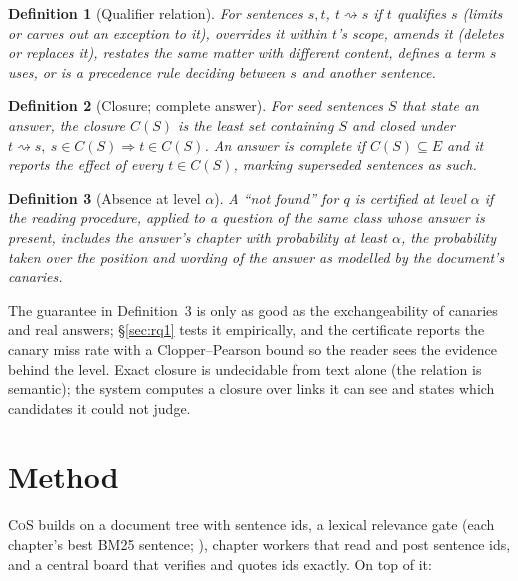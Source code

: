 \documentclass[11pt]{article}
\newtheorem{definition}{Definition}
\newcommand{\system}{\textsc{CoS}}          %
\begin{document}
\begin{definition}[Qualifier relation]
For sentences $s, t$, $t \rightsquigarrow s$ if $t$ \emph{qualifies} $s$ (limits or carves out an exception to it), \emph{overrides} it within $t$'s scope, \emph{amends} it (deletes or replaces it), \emph{restates} the same matter with different content, \emph{defines} a term $s$ uses, or is a \emph{precedence} rule deciding between $s$ and another sentence.
\end{definition}

\begin{definition}[Closure; complete answer]
For seed sentences $S$ that state an answer, the closure $C(S)$ is the least set containing $S$ and closed under $t \rightsquigarrow s,\ s \in C(S) \Rightarrow t \in C(S)$. An answer is \emph{complete} if $C(S) \subseteq E$ and it reports the effect of every $t \in C(S)$, marking superseded sentences as such.
\end{definition}

\begin{definition}[Absence at level $\alpha$]
A ``not found'' for $q$ is certified at level $\alpha$ if the reading procedure, applied to a question of the same class whose answer is present, includes the answer's chapter with probability at least $\alpha$, the probability taken over the position and wording of the answer as modelled by the document's canaries.
\end{definition}

\noindent The guarantee in Definition~3 is only as good as the exchangeability of canaries and real answers; \S\ref{sec:rq1} tests it empirically, and the certificate reports the canary miss rate with a Clopper--Pearson bound \citep{clopper1934use} so the reader sees the evidence behind the level. Exact closure is undecidable from text alone (the relation is semantic); the system computes a closure over links it can see and states which candidates it could not judge.

\section{Method}
\label{sec:method}

\system{} builds on a document tree with sentence ids, a lexical relevance gate (each chapter's best BM25 sentence; \citealp{robertson2009bm25}), chapter workers that read and post sentence ids, and a central board that verifies and quotes ids exactly. On top of it:
\end{document}
